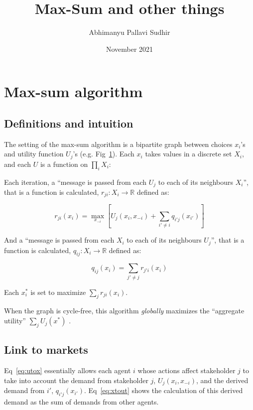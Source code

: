 \documentclass{article}
\title{Max-Sum and other things}
\author{Abhimanyu Pallavi Sudhir}
\date{November 2021}
\newcommand{\R}{\mathbb{R}}
\theoremstyle{definition}
\begin{document}
\maketitle

\section{Max-sum algorithm}

\subsection{Definitions and intuition}

The setting of the max-sum algorithm is a bipartite graph between choices $x_i$'s and utility function $U_j$'s (e.g. Fig~\ref{fig:bipartite}). Each $x_i$ takes values in a discrete set $X_i$, and each $U$ is a function on $\prod_{i}{X_i}$:

\begin{figure}
    \centering
    
    \label{fig:bipartite}
\end{figure}

Each iteration, a ``message is passed from each $U_j$ to each of its neighbours $X_i$'', that is a function is calculated, $r_{ji}:X_i\to\R$ defined as:

\begin{equation}
    r_{ji}(x_i)=
    \max_{x_{-i}}\left[{U_j(x_i,x_{-i}) + \sum_{i'\ne i}{q_{i'j}(x_{i'})}}\right]
    \label{eq:utox}
\end{equation}

And a ``message is passed from each $X_i$ to each of its neighbours $U_j$'', that is a function is calculated, $q_{ij}:X_i\to\R$ defined as:

\begin{equation}
    q_{ij}(x_i) = \sum_{j'\ne j}{r_{j'i}(x_i)}
    \label{eq:xtout}
\end{equation}

Each $x_i^*$ is set to maximize $\sum_{j}{r_{ji}(x_i)}$.

When the graph is cycle-free, this algorithm \emph{globally} maximizes the ``aggregate utility'' $\sum_j{U_j}(x^*)$ \cite{rogers}.

\subsection{Link to markets}

Eq~\ref{eq:utox} essentially allows each agent $i$ whose actions affect stakeholder $j$ to take into account the demand from stakeholder $j$, $U_j(x_i,x_{-i})$, and the derived demand from $i'$, $q_{i'j}(x_{i'})$. Eq~\ref{eq:xtout} shows the calculation of this derived demand as the sum of demands from other agents. 
\end{document}
